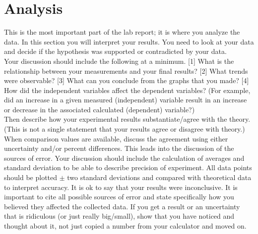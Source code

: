 \documentclass[12pt]{article}
\begin{document}



\section{Analysis}
	This is the most important part of the lab report; it is where you
analyze the data. In this section you will interpret your results. You need to look at your data and decide if the hypothesis was supported or contradicted by your data.  \\ %
    
    Your discussion should include the following at a minimum. [1] What is the relationship between your measurements and your final results? [2] What trends were observable? [3] What can you conclude from the graphs that you made? [4] How did the independent variables affect the dependent variables? (For example, did an increase in a given measured (independent) variable result in an increase or decrease in the associated calculated (dependent) variable?) \\ 

Then describe how your experimental results substantiate/agree with the theory. (This is not a single statement that your results agree or disagree with theory.) When comparison values are available, discuss the agreement using either uncertainty and/or percent differences. This leads into the discussion of the sources of error. Your discussion should include the calculation of averages and standard deviation to be able to describe precision of experiment. All data points should be plotted $\pm$ two standard deviations and compared with theoretical data to interpret accuracy. It is ok to say that your results were inconclusive. It is important to cite all possible sources of error and state specifically how you believed they affected the collected data. If you get a result or an uncertainty that is ridiculous (or just really big/small), show that you have noticed and thought about it, not just copied a number from your calculator and moved on. \\
\end{document}

